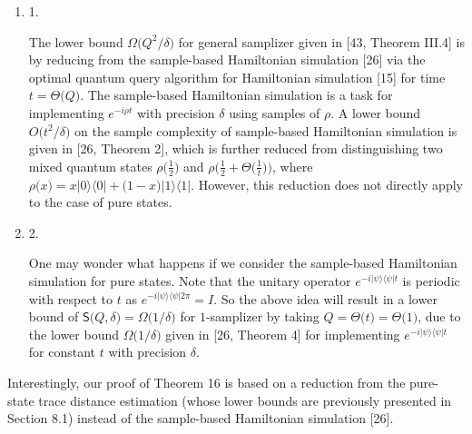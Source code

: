 \begin{enumerate}


\item[] 
1. 


The lower bound $\Omega\lparen Q^{2}/\delta\rparen$ for general samplizer given in [43, Theorem III.4] is by reducing from the sample-based Hamiltonian simulation [26] via the optimal quantum query algorithm for Hamiltonian simulation [15] for time $t=\Theta\lparen Q\rparen$.
The sample-based Hamiltonian simulation is a task for implementing $e^{-i\rho t}$ with precision $\delta$ using samples of $\rho$. A lower bound $O\lparen t^{2}/\delta\rparen$ on the sample complexity of sample-based Hamiltonian simulation is given in [26, Theorem 2], which is further reduced from distinguishing two mixed quantum states $\rho\lparen\frac{1}{2}\rparen$ and $\rho\lparen\frac{1}{2}+\Theta\lparen\frac{1}{t}\rparen\rparen$, where $\rho\lparen x\rparen=x\lvert 0\rangle\!\langle 0\rvert+\lparen 1-x\rparen\lvert 1\rangle\!\langle 1\rvert$.
However, this reduction does not directly apply to the case of pure states.\par





\item[] 
2. 


One may wonder what happens if we consider the sample-based Hamiltonian simulation for pure states. Note that the unitary operator $e^{-i\lvert\psi\rangle\!\langle\psi\rvert t}$ is periodic with respect to $t$ as $e^{-i\lvert\psi\rangle\!\langle\psi\rvert 2\pi}=I$.
So the above idea will result in a lower bound of $\mathsf{S}\lparen Q,\delta\rparen=\Omega\lparen 1/\delta\rparen$ for $1$-samplizer by taking $Q=\Theta\lparen t\rparen=\Theta\lparen 1\rparen$, due to the lower bound $\Omega\lparen 1/\delta\rparen$ given in [26, Theorem 4] for implementing $e^{-i\lvert\psi\rangle\!\langle\psi\rvert t}$ for constant $t$ with precision $\delta$.\par





\end{enumerate}




Interestingly, our proof of Theorem 16 is based on a reduction from the pure-state trace distance estimation (whose lower bounds are previously presented in Section 8.1) instead of the sample-based Hamiltonian simulation [26].\par




